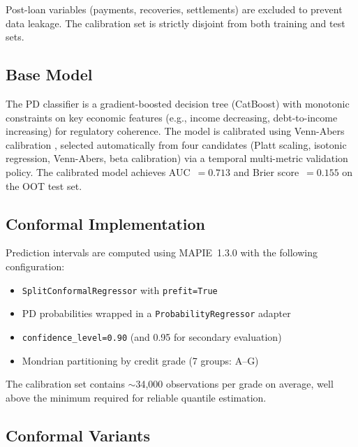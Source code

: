 \documentclass[pmlr]{jmlr}
\begin{document}
Post-loan variables (payments, recoveries, settlements) are excluded to
prevent data leakage.  The calibration set is strictly disjoint from both
training and test sets.

\subsection{Base Model}

The PD classifier is a gradient-boosted decision tree (CatBoost) with
monotonic constraints on key economic features (e.g., income decreasing,
debt-to-income increasing) for regulatory coherence.  The model is calibrated
using Venn-Abers calibration \citep{vovk2005}, selected automatically from
four candidates (Platt scaling, isotonic regression, Venn-Abers, beta
calibration) via a temporal multi-metric validation policy.  The calibrated
model achieves AUC~$= 0.713$ and Brier score~$= 0.155$ on the OOT test set.

\subsection{Conformal Implementation}

Prediction intervals are computed using MAPIE~1.3.0
\citep{taquet2022mapie} with the following configuration:
\begin{itemize}
    \item \texttt{SplitConformalRegressor} with \texttt{prefit=True}
    \item PD probabilities wrapped in a \texttt{ProbabilityRegressor} adapter
    \item \texttt{confidence\_level=0.90} (and 0.95 for secondary evaluation)
    \item Mondrian partitioning by credit grade (7 groups: A--G)
\end{itemize}

The calibration set contains $\sim$34{,}000 observations per grade on average,
well above the minimum required for reliable quantile estimation.

\subsection{Conformal Variants}
\end{document}
